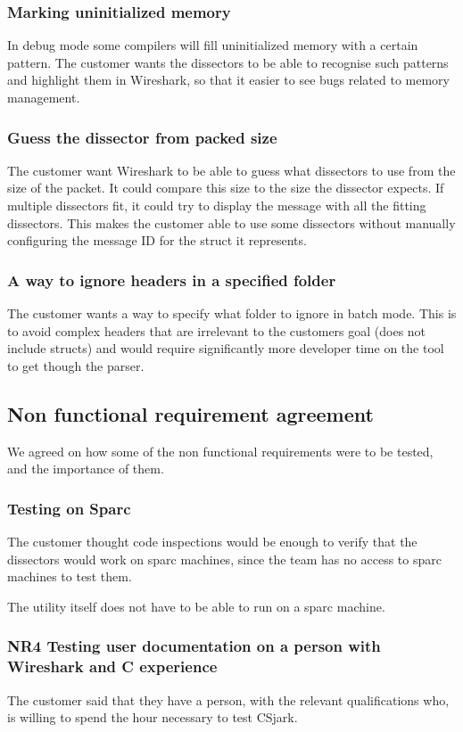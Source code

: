\subsubsection{Marking uninitialized memory}
In debug mode some compilers will fill uninitialized memory with a certain pattern. The customer wants the dissectors to be able to recognise such patterns and highlight them in Wireshark, so that it easier to see bugs related to memory management.
\subsubsection{Guess the dissector from packed size}
The customer want Wireshark to be able to guess what dissectors to use from the size of the packet. It could compare this size to the size the dissector expects. If multiple dissectors fit, it could try to display the message with all the fitting dissectors. This makes the customer able to use some dissectors without manually configuring the message ID for the struct it represents.
\subsubsection{A way to ignore headers in a specified folder}
The customer wants a way to specify what folder to ignore in batch mode. This is to avoid complex headers that are irrelevant to the customers goal (does not include structs) and would require significantly more developer time on the tool to get though the parser.
\subsection{Non functional requirement agreement}
We agreed on how some of the non functional requirements were to be tested, and the importance of them. 
\subsubsection{Testing on Sparc}
The customer thought code inspections would be enough to verify that the dissectors would work on sparc machines, since the team has no access to sparc machines to test them.

The utility itself does not have to be able to run on a sparc machine.
\subsubsection{NR4 Testing user documentation on a person with Wireshark and C experience}
The customer said that they have a person, with the relevant qualifications who, is willing to spend the hour necessary to test CSjark.
